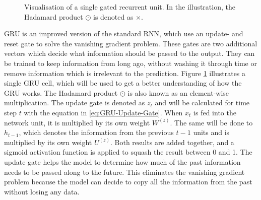 \begin{figure}[htbp]
    \caption[Visualisation of a single gated recurrent unit]{Visualisation of a single gated recurrent unit. In the illustration, the Hadamard product $\odot$ is denoted as $\times$.}
    \label{fig:GRU-Visualisation}
\end{figure}
\noindent
\gls{GRU} is an improved version of the standard \gls{RNN}, which use an update- and reset gate to solve the vanishing gradient problem. These gates are two additional vectors which decide what information should be passed to the output. They can be trained to keep information from long ago, without washing it through time or remove information which is irrelevant to the prediction. Figure \ref{fig:GRU-Visualisation} illustrates a single \gls{GRU} cell, which will be used to get a better understanding of how the \gls{GRU} works. The Hadamard product $\odot$ is also known as an element-wise multiplication.
\newline
\newline
The update gate is denoted as $z_t$ and will be calculated for time step $t$ with the equation in \ref{eq:GRU-Update-Gate}. When $x_t$ is fed into the network unit, it is multiplied by its own weight $W^{(z)}$. The same will be done to $h_{t-1}$, which denotes the information from the previous $t-1$ units and is multiplied by its own weight $U^{(z)}$. Both results are added together, and a sigmoid activation function is applied to squash the result between 0 and 1. The update gate helps the model to determine how much of the past information needs to be passed along to the future. This eliminates the vanishing gradient problem because the model can decide to copy all the information from the past without losing any data.

